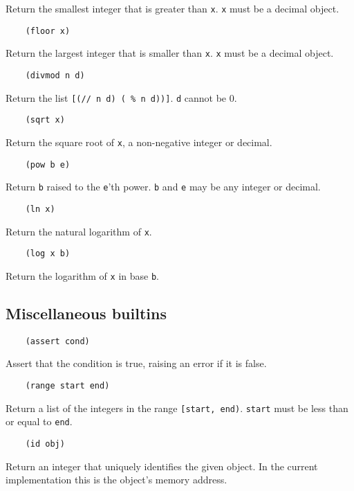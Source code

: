 \documentclass{article}
\newcommand{\inlinecode}{\texttt}
\begin{document}
Return the smallest integer that is greater than \inlinecode{x}. \inlinecode{x} must be a decimal object.

\begin{verbatim}
    (floor x)
\end{verbatim}

Return the largest integer that is smaller than \inlinecode{x}. \inlinecode{x} must be a decimal object.

\begin{verbatim}
    (divmod n d)
\end{verbatim}

Return the list \inlinecode{[(// n d)  ( \% n d))]}. \inlinecode{d} cannot be 0.

\begin{verbatim}
    (sqrt x)
\end{verbatim}

Return the square root of \inlinecode{x}, a non-negative integer or decimal.

\begin{verbatim}
    (pow b e)
\end{verbatim}

Return \inlinecode{b} raised to the \inlinecode{e}'th power. \inlinecode{b} and \inlinecode{e} may be any integer or decimal.

\begin{verbatim}
    (ln x)
\end{verbatim}

Return the natural logarithm of \inlinecode{x}.

\begin{verbatim}
    (log x b)
\end{verbatim}

Return the logarithm of \inlinecode{x} in base \inlinecode{b}.

\subsection{Miscellaneous builtins}
\begin{verbatim}
    (assert cond)
\end{verbatim}

Assert that the condition is true, raising an error if it is false.

\begin{verbatim}
    (range start end)
\end{verbatim}

Return a list of the integers in the range \inlinecode{[start, end)}. \inlinecode{start} must be less than or equal to \inlinecode{end}.

\begin{verbatim}
    (id obj)
\end{verbatim}

Return an integer that uniquely identifies the given object. In the current implementation this is the object's memory address.
\end{document}
